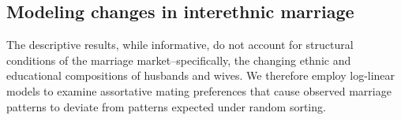 \subsection{Modeling changes in interethnic marriage}

The descriptive results, while informative, do not account for structural
conditions of the marriage market--specifically, the changing ethnic and
educational compositions of husbands and wives.
We therefore employ log-linear models to examine assortative mating preferences
that cause observed marriage patterns to deviate from patterns expected under
random sorting.



